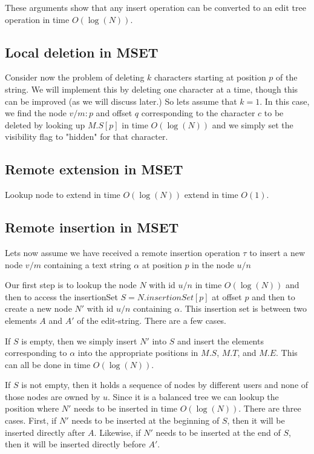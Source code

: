 \documentclass{amsart}
\begin{document}
These arguments show that any insert operation can be converted to an edit tree operation in time $O(\log(N))$.



\subsection{Local deletion in MSET}
Consider now the problem of deleting $k$ characters 
starting at position $p$ of the string.
We will implement this by deleting one character at a time, though this can be
improved (as we will discuss later.) So lets assume that $k=1$. In this case,
we find the node $v/m:p$ and offset $q$ corresponding to the character $c$ to be deleted by looking up $M.S[p]$ in time $O(\log(N))$
and we simply set the visibility flag to "hidden" for that character.

\subsection{Remote extension in MSET}
Lookup node to extend in time $O(\log(N))$
extend in time $O(1)$.

\subsection{Remote insertion in MSET}
Lets now assume we have received a remote insertion operation $\tau$
to insert a new node $v/m$ containing a text string $\alpha$  
at position $p$ 
in the node $u/n$

Our first step is to lookup the node $N$ with id $u/n$ in time $O(\log(N))$
and then to access the insertionSet $S=N.insertionSet[p]$ at offset $p$
and then to create a new node $N'$ with id $u/n$ containing $\alpha$.
This insertion set is between two elements $A$ and $A'$ of the edit-string.
There are a few cases.

If $S$ is empty, then we simply insert $N'$ into $S$ and insert the elements
corresponding to $\alpha$ into the appropriate positions in $M.S$, $M.T$, and $M.E$. This can all be done in time $O(\log(N))$.

If $S$ is not empty, then it holds a sequence of nodes by different users and none of those nodes are owned by $u$.  Since it is a balanced tree we can lookup the position where $N'$ needs to be inserted in time $O(\log(N))$. There are three
cases. First, if $N'$ needs to be inserted at the beginning of $S$, then 
it will be inserted directly after $A$. Likewise, if $N'$ needs to be inserted at the
end of $S$, then it will be inserted directly before $A'$. 
\end{document}
